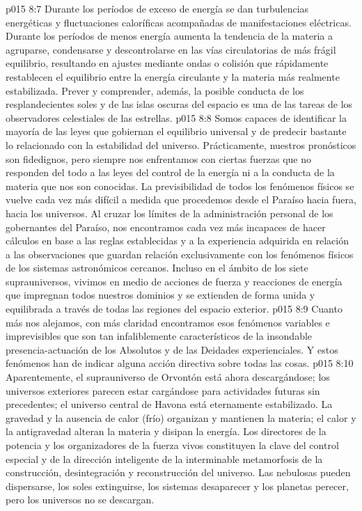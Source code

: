\vs p015 8:7 Durante los períodos de exceso de energía se dan turbulencias energéticas y fluctuaciones caloríficas acompañadas de manifestaciones eléctricas. Durante los períodos de menos energía aumenta la tendencia de la materia a agruparse, condensarse y descontrolarse en las vías circulatorias de más frágil equilibrio, resultando en ajustes mediante ondas o colisión que rápidamente restablecen el equilibrio entre la energía circulante y la materia más realmente estabilizada. Prever y comprender, además, la posible conducta de los resplandecientes soles y de las islas oscuras del espacio es una de las tareas de los observadores celestiales de las estrellas.
\vs p015 8:8 Somos capaces de identificar la mayoría de las leyes que gobiernan el equilibrio universal y de predecir bastante lo relacionado con la estabilidad del universo. Prácticamente, nuestros pronósticos son fidedignos, pero siempre nos enfrentamos con ciertas fuerzas que no responden del todo a las leyes del control de la energía ni a la conducta de la materia que nos son conocidas. La previsibilidad de todos los fenómenos físicos se vuelve cada vez más difícil a medida que procedemos desde el Paraíso hacia fuera, hacia los universos. Al cruzar los límites de la administración personal de los gobernantes del Paraíso, nos encontramos cada vez más incapaces de hacer cálculos en base a las reglas establecidas y a la experiencia adquirida en relación a las observaciones que guardan relación exclusivamente con los fenómenos físicos de los sistemas astronómicos cercanos. Incluso en el ámbito de los siete suprauniversos, vivimos en medio de acciones de fuerza y reacciones de energía que impregnan todos nuestros dominios y se extienden de forma unida y equilibrada a través de todas las regiones del espacio exterior.
\vs p015 8:9 Cuanto más nos alejamos, con más claridad encontramos esos fenómenos variables e imprevisibles que son tan infaliblemente característicos de la insondable presencia\hyp{}actuación de los Absolutos y de las Deidades experienciales. Y estos fenómenos han de indicar alguna acción directiva sobre todas las cosas.
\vs p015 8:10 Aparentemente, el suprauniverso de Orvontón está ahora descargándose; los universos exteriores parecen estar cargándose para actividades futuras sin precedentes; el universo central de Havona está eternamente estabilizado. La gravedad y la ausencia de calor (frío) organizan y mantienen la materia; el calor y la antigravedad alteran la materia y disipan la energía. Los directores de la potencia y los organizadores de la fuerza vivos constituyen la clave del control especial y de la dirección inteligente de la interminable metamorfosis de la construcción, desintegración y reconstrucción del universo. Las nebulosas pueden dispersarse, los soles extinguirse, los sistemas desaparecer y los planetas perecer, pero los universos no se descargan.
